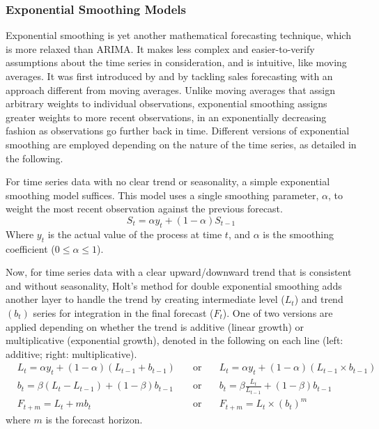 \documentclass[stu,floatsintext]{apa7}
\begin{document}
\subsubsection{Exponential Smoothing Models}

Exponential smoothing is yet another mathematical forecasting technique, which is more relaxed than ARIMA. It makes less complex and easier-to-verify assumptions about the time series in consideration, and is intuitive, like moving averages. It was first introduced by \textcite{holt1957forecasting} and \textcite{winters1960forecasting} by tackling sales forecasting with an approach different from moving averages. Unlike moving averages that assign arbitrary weights to individual observations, exponential smoothing assigns greater weights to more recent observations, in an exponentially decreasing fashion as observations go further back in time. Different versions of exponential smoothing are employed depending on the nature of the time series, as detailed in the following.

For time series data with no clear trend or seasonality, a simple exponential smoothing model suffices. This model uses a single smoothing parameter, $\alpha$, to weight the most recent observation against the previous forecast.
\begin{equation}S_t = \alpha y_t + (1 - \alpha) S_{t-1}\end{equation}
Where $y_t$ is the actual value of the process at time $t$, and $\alpha$ is the smoothing coefficient ($0\le\alpha\le 1$).

Now, for time series data with a clear upward/downward trend that is consistent and without seasonality, Holt’s method for double exponential smoothing adds another layer to handle the trend by creating intermediate level ($L_t$) and trend $(b_t)$ series for integration in the final forecast ($F_t$). One of two versions are applied depending on whether the trend is additive (linear growth) or multiplicative (exponential growth), denoted in the following on each line (left: additive; right: multiplicative).
\begin{align}
&L_t = \alpha y_t + (1 - \alpha)(L_{t-1} + b_{t-1})\quad&\text{or}\quad &L_t = \alpha y_t + (1 - \alpha)(L_{t-1} \times b_{t-1})\\
&b_t = \beta (L_t - L_{t-1}) + (1 - \beta) b_{t-1}\quad&\text{or}\quad &b_t = \beta \frac{L_t}{L_{t-1}} + (1 - \beta) b_{t-1}\\
&F_{t+m} = L_t + mb_t\quad&\text{or}\quad &F_{t+m} = L_t \times (b_t)^m
\end{align}
where $m$ is the forecast horizon.
\end{document}
